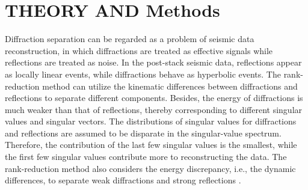 %



\section*{THEORY AND Methods}
Diffraction separation can be regarded as a problem of seismic data reconstruction, in which diffractions are treated as effective signals while reflections are treated as noise.  In the post-stack seismic data, reflections appear as locally linear events, while diffractions behave as hyperbolic events.  The rank-reduction method can utilize the kinematic differences between diffractions and reflections to separate different components. Besides, the energy of diffractions is much weaker than that of reflections, thereby corresponding to different singular values and singular vectors. The distributions of singular values for diffractions and reflections are assumed to be disparate in the singular-value spectrum. Therefore, the contribution of the last few singular values is the smallest, while the first few singular values contribute more to reconstructing the data. The rank-reduction method also considers the energy discrepancy, i.e., the dynamic differences, to separate weak diffractions and strong reflections \cite[]{2010Separation, 2016Diffraction}.    

